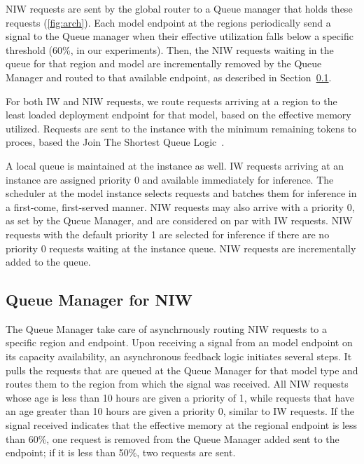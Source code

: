 NIW requests are sent by the global router to a Queue manager that holds these requests (\autoref{fig:arch}). Each model endpoint at the regions periodically send a signal to the Queue manager when their effective utilization falls below a specific threshold (60\%, in our experiments). Then, the NIW requests waiting in the queue for that region and model are incrementally removed by the Queue Manager and routed to that available endpoint, as described in Section~\ref{sec:queuemanager}.

  For both IW and NIW requests, we route requests arriving at a region to the least loaded deployment endpoint for that model, based on the effective memory utilized. Requests are sent to the instance with the minimum remaining tokens to proces, based the Join The Shortest Queue Logic~\cite{gupta2007analysis}.

 A local queue is maintained at the instance as well. IW requests arriving at an instance are assigned priority 0 and available immediately for inference. The scheduler at the model instance selects requests and batches them for inference in a first-come, first-served manner. 
NIW requests may also arrive with a priority 0, as set by the Queue Manager, and are considered on par with IW requests. NIW requests with the default priority 1 are selected for inference if there are no priority 0 requests waiting at the instance queue. NIW requests are incrementally added to the queue.


\subsection{Queue Manager for NIW} \label{sec:queuemanager}
The Queue Manager take care of asynchrnously routing NIW requests to a specific region and endpoint. Upon receiving a signal from an model endpoint on its capacity availability, an asynchronous feedback logic initiates several steps. It pulls the requests that are queued at the Queue Manager for that model type and routes them to the region from which the signal was received. All NIW requests whose age is less than 10 hours are given a priority of 1, while requests that have an age greater than 10 hours are given a priority 0, similar to IW requests. If the signal received indicates that the effective memory at the regional endpoint is less than 60\%, one request is removed from the Queue Manager added sent to the endpoint; if it is less than 50\%, two requests are sent.


